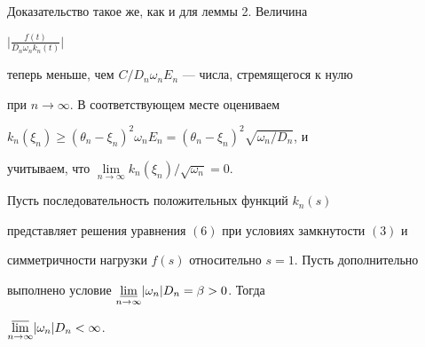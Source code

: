 Доказательство такое же, как и для леммы 2. Величина


$\big| \frac{f(t)}{D_n \omega_n k_n(t)}\big|$


теперь меньше, чем $C/D_n \omega_n E_n$ --- числа, стремящегося к нулю


при ${n\to \infty}$. В соответствующем месте оцениваем


$k_n(\xi_n) \ge (\theta_n -\xi_n)^2 \omega_n E_n=({\theta


_n-\xi_n})^2\sqrt{\omega_n/D_n}$, и


учитываем, что $\lim\limits_{n\to \infty}k_n(\xi_n)/


\sqrt{\omega_n}=0$.





\begin{lem}


Пусть последовательность положительных функций $k_n(s)$


представляет решения уравнения $(6)$ при условиях замкнутости $(3)$ и


симметричности нагрузки $f(s)$ относительно $s=1$. Пусть дополнительно


выполнено условие $\underset{n\to \infty}{\varliminf}


|{\omega_n}|D_n=\beta >0$. Тогда


$\underset{n\to \infty}{\varlimsup}|{\omega_n}|D_n<\infty$.


\end{lem}






